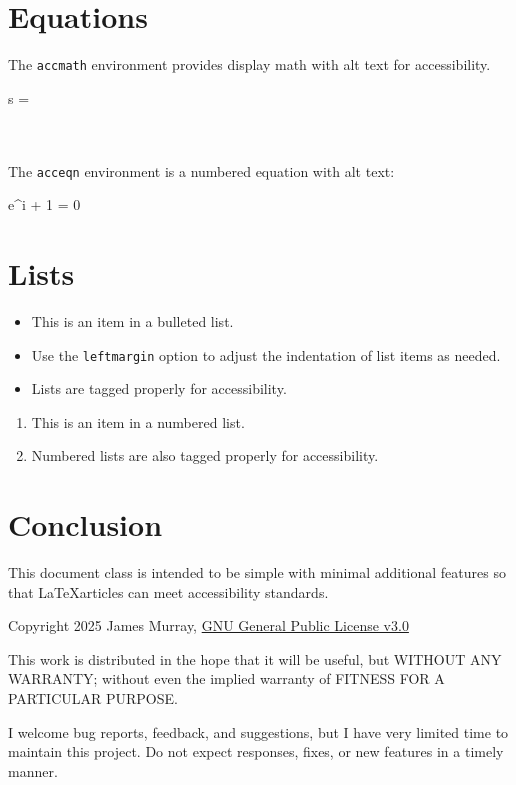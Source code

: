 \documentclass{accessarticle}
\begin{document}

\section{Equations}

The \texttt{accmath} environment provides display math with alt text for accessibility. \\
  
\begin{accmath}
  s = 
\end{accmath}

\ \\ \ \\
The \texttt{acceqn} environment is a numbered equation with alt text: 

\begin{acceqn}
  e^{i\pi} + 1 = 0 
\end{acceqn}

\section{Lists}

\begin{itemize}[leftmargin=3pc]
  \item This is an item in a bulleted list.
  \item Use the \texttt{leftmargin} option to adjust the indentation of list items as needed.
  \item Lists are tagged properly for accessibility.
\end{itemize}

\begin{enumerate}
  \item This is an item in a numbered list.
  \item Numbered lists are also tagged properly for accessibility.
\end{enumerate}

\section{Conclusion}

This document class is intended to be simple with minimal additional features so that \LaTeX articles can meet accessibility standards.  

Copyright 2025 James Murray, \href{https://www.gnu.org/licenses/gpl-3.0.en.html}{GNU General Public License v3.0}

This work is distributed in the hope that it will be useful, but WITHOUT ANY WARRANTY; without even the implied warranty of FITNESS FOR A PARTICULAR PURPOSE.

I welcome bug reports, feedback, and suggestions, but I have very limited time to maintain this project. Do not expect responses, fixes, or new features in a timely manner.
\end{document}
